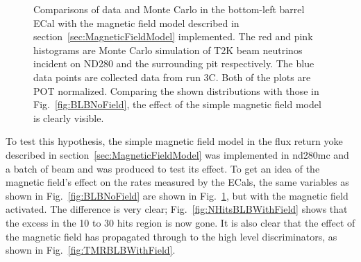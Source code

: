 \begin{figure}[bottom]%
  \centering
  \caption{Comparisons of data and Monte Carlo in the bottom-left barrel ECal with the magnetic field model described in section~\ref{sec:MagneticFieldModel} implemented.  The red and pink histograms are Monte Carlo simulation of T2K beam neutrinos incident on ND280 and the surrounding pit respectively.  The blue data points are collected data from run 3C.  Both of the plots are POT normalized.  Comparing the shown distributions with those in Fig.~\ref{fig:BLBNoField}, the effect of the simple magnetic field model is clearly visible.}
  \label{fig:BLBWithField}
\end{figure}
To test this hypothesis, the simple magnetic field model in the flux return yoke described in section~\ref{sec:MagneticFieldModel} was implemented in nd280mc and a batch of beam and  was produced to test its effect.  To get an idea of the magnetic field's effect on the rates measured by the ECals, the same variables as shown in Fig.~\ref{fig:BLBNoField} are shown in Fig.~\ref{fig:BLBWithField}, but with the magnetic field activated.  The difference is very clear; Fig.~\ref{fig:NHitsBLBWithField} shows that the excess in the 10 to 30 hits region is now gone.  It is also clear that the effect of the magnetic field has propagated through to the high level discriminators, as shown in Fig.~\ref{fig:TMRBLBWithField}.

